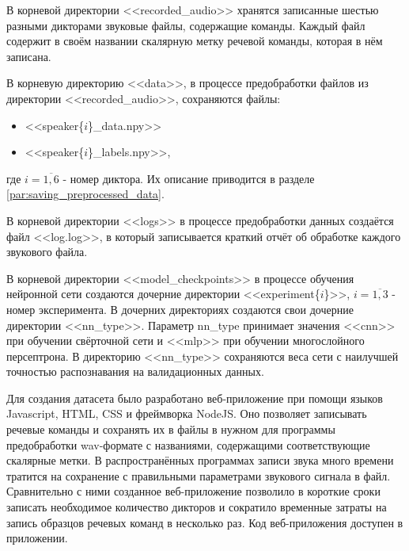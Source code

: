 В корневой директории <<recorded\_audio>> хранятся записанные шестью разными дикторами звуковые файлы, содержащие команды. Каждый файл содержит в своём названии скалярную метку речевой команды, которая в нём записана.

В корневую директорию <<data>>, в процессе предобработки файлов из директории <<recorded\_audio>>, сохраняются файлы:
\begin{itemize}[leftmargin=2cm]
	\item <<speaker\{$i$\}\_data.npy>>\footnotemark 
	\item <<speaker\{$i$\}\_labels.npy>>\footnotemark[\value{footnote}],
\end{itemize}
где  $i=\overline{1,6}$ - номер диктора. Их описание приводится в разделе \ref{par:saving_preprocessed_data}.

В корневой директории <<logs>> в процессе предобработки данных создаётся файл <<log.log>>, в который записывается краткий отчёт об обработке каждого звукового файла.

В корневой директории <<model\_checkpoints>> в процессе обучения нейронной сети создаются дочерние директории <<experiment\{$i$\}>>\footnotemark[\value{footnote}] , $i=\overline{1,3}$ - номер эксперимента. В дочерних директориях создаются свои дочерние директории <<{nn\_type}>>. Параметр nn\_type принимает значения <<cnn>> при обучении свёрточной сети и <<mlp>> при обучении многослойного персептрона. В директорию <<{nn\_type}>> сохраняются веса сети с наилучшей точностью распознавания на валидационных данных.

Для создания датасета было разработано веб-приложение при помощи языков Javascript, HTML, CSS и фреймворка NodeJS. Оно позволяет записывать речевые команды и сохранять их в файлы в нужном для программы предобработки wav-формате с названиями, содержащими соответствующие скалярные метки. В распространённых программах записи звука много времени тратится на сохранение с правильными параметрами звукового сигнала в файл. Сравнительно с ними созданное веб-приложение позволило в короткие сроки записать необходимое количество дикторов и сократило временные затраты на запись образцов речевых команд в несколько раз. Код веб-приложения доступен в приложении.

